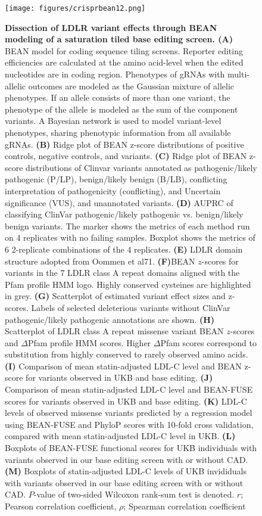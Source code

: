 \documentclass[a4paper, titlepage, openright]{book}
\begin{document}
\begin{figure}
	\centering
	\texttt{[image: figures/crisprbean12.png]}
	\caption[Dissection of LDLR variant effects through BEAN modeling of a saturation tiled base editing screen]{\textbf{Dissection of LDLR variant effects through BEAN modeling of a saturation tiled base editing screen. (A)} BEAN model for coding sequence tiling screens. Reporter editing efficiencies are calculated at the amino acid-level when the edited nucleotides are in coding region. Phenotypes of gRNAs with multi-allelic outcomes are modeled as the Gaussian mixture of allelic phenotypes. If an allele consists of more than one variant, the phenotype of the allele is modeled as the sum of the component variants. A Bayesian network is used to model variant-level phenotypes, sharing phenotypic information from all available gRNAs. \textbf{(B)} Ridge plot of BEAN z-score distributions of positive controls, negative controls, and variants. \textbf{(C)} Ridge plot of BEAN z-score distributions of Clinvar variants annotated as pathogenic/likely pathogenic (P/LP), benign/likely benign  (B/LB), conflicting interpretation of pathogenicity (conflicting), and Uncertain significance (VUS), and unannotated variants. \textbf{(D)} AUPRC of classifying ClinVar pathogenic/likely pathogenic vs. benign/likely benign variants. The marker shows the metrics of each method run on 4 replicates with no failing samples. Boxplot shows the metrics of 6 2-replicate combinations of the 4 replicates. \textbf{(E)} LDLR domain structure adopted from Oommen et al71. \textbf{(F)}BEAN $z$-scores for variants in the 7 LDLR class A repeat domains aligned with the Pfam profile HMM logo. Highly conserved cysteines are highlighted in grey. \textbf{(G)} Scatterplot of estimated variant effect sizes and z-scores. Labels of selected deleterious variants without ClinVar pathogenic/likely pathogenic annotations are shown. \textbf{(H)} Scatterplot of LDLR class A repeat missense variant BEAN $z$-scores and $\Delta$Pfam profile HMM scores. Higher $\Delta$Pfam scores correspond to substitution from highly conserved to rarely observed amino acids. \textbf{(I)} Comparison of mean statin-adjusted LDL-C level and BEAN z-score for variants observed in UKB and base editing. \textbf{(J)} Comparison of mean statin-adjusted LDL-C level and BEAN-FUSE scores for variants observed in UKB and base editing. \textbf{(K)} LDL-C levels of observed missense variants predicted by a regression model using BEAN-FUSE and PhyloP scores with 10-fold cross validation, compared with mean statin-adjusted LDL-C level in UKB. \textbf{(L)} Boxplots of BEAN-FUSE functional scores for UKB individuals with variants observed in our base editing screen with or without CAD. \textbf{(M)} Boxplots of statin-adjusted LDL-C levels of UKB invididuals with variants observed in our base editing screen with or without CAD. $P$-value of two-sided Wilcoxon rank-sum test is denoted. $r$; Pearson correlation coefficient, $\rho$; Spearman correlation coefficient}
	\label{fig:crisprbean12}
\end{figure} 
\end{document}
